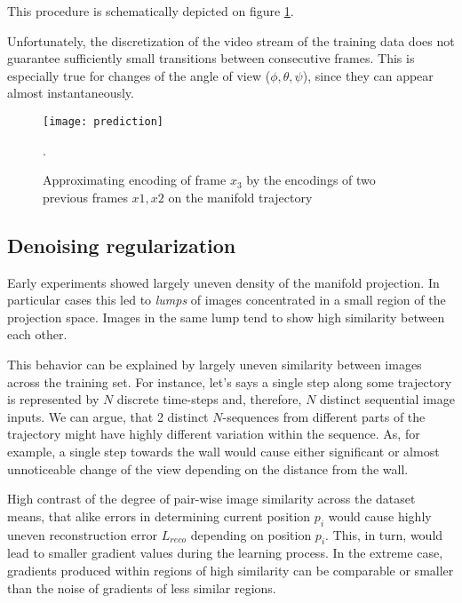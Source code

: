 This procedure is schematically depicted on figure \ref{fig:m_pred}.

Unfortunately, the discretization of the video stream of the training data does not guarantee sufficiently small transitions between consecutive frames.
This is especially true for changes of the angle of view ($\phi, \theta, \psi$), since they can appear almost instantaneously.

\begin{figure}[h!]
  \centering
    \texttt{[image: prediction]}
  \caption{Approximating encoding of frame $x_3$ by the encodings of two previous frames $x1, x2$ on the manifold trajectory}.
  \label{fig:m_pred}
\end{figure}


\subsection{Denoising regularization}

Early experiments showed largely uneven density of the manifold projection.
In particular cases this led to \textit{lumps} of images concentrated in a small region of the projection space.
Images in the same lump tend to show high similarity between each other.

This behavior can be explained by largely uneven similarity between images across the training set.
For instance, let's says a single step along some trajectory is represented by $N$ discrete time-steps and, therefore, $N$ distinct sequential image inputs.
We can argue, that 2 distinct $N$-sequences from different parts of the trajectory might have highly different variation within the sequence.
As, for example, a single step towards the wall would cause either significant or almost unnoticeable change of the view depending on the distance from the wall.

High contrast of the degree of pair-wise image similarity across the dataset means, that alike errors in determining current position $p_i$ would cause highly uneven reconstruction error $L_{reco}$ depending on position $p_i$.
This, in turn, would lead to smaller gradient values during the learning process.
In the extreme case, gradients produced within regions of high similarity can be comparable or smaller than the noise of gradients of less similar regions.

